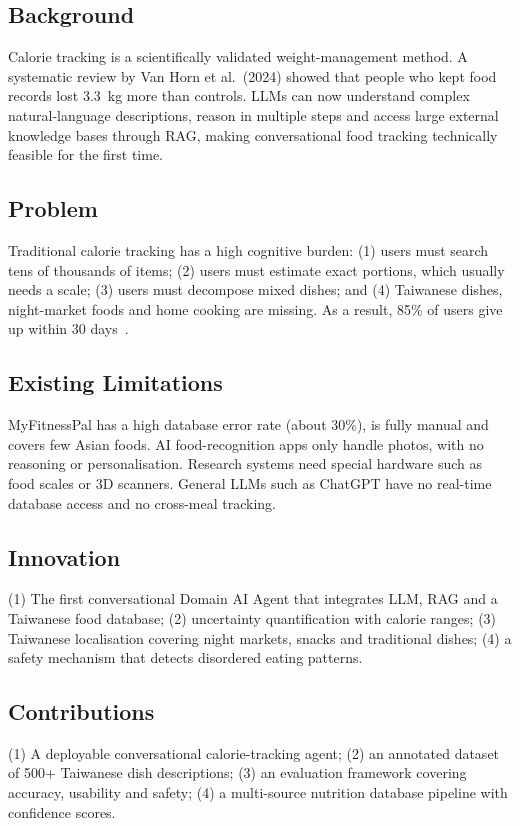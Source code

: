 \documentclass[conference]{IEEEtran}
\begin{document}
\subsection{Background}
Calorie tracking is a scientifically validated weight-management method. A systematic review by Van Horn et al.\ (2024) showed that people who kept food records lost 3.3~kg more than controls. LLMs can now understand complex natural-language descriptions, reason in multiple steps and access large external knowledge bases through RAG, making conversational food tracking technically feasible for the first time.

\subsection{Problem}
Traditional calorie tracking has a high cognitive burden: (1) users must search tens of thousands of items; (2) users must estimate exact portions, which usually needs a scale; (3) users must decompose mixed dishes; and (4) Taiwanese dishes, night-market foods and home cooking are missing. As a result, 85\% of users give up within 30 days~\cite{helander2014}.

\subsection{Existing Limitations}
MyFitnessPal has a high database error rate (about 30\%), is fully manual and covers few Asian foods. AI food-recognition apps only handle photos, with no reasoning or personalisation. Research systems need special hardware such as food scales or 3D scanners. General LLMs such as ChatGPT have no real-time database access and no cross-meal tracking.

\subsection{Innovation}
(1) The first conversational Domain AI Agent that integrates LLM, RAG and a Taiwanese food database; (2) uncertainty quantification with calorie ranges; (3) Taiwanese localisation covering night markets, snacks and traditional dishes; (4) a safety mechanism that detects disordered eating patterns.

\subsection{Contributions}
(1) A deployable conversational calorie-tracking agent; (2) an annotated dataset of 500+ Taiwanese dish descriptions; (3) an evaluation framework covering accuracy, usability and safety; (4) a multi-source nutrition database pipeline with confidence scores.
\end{document}
